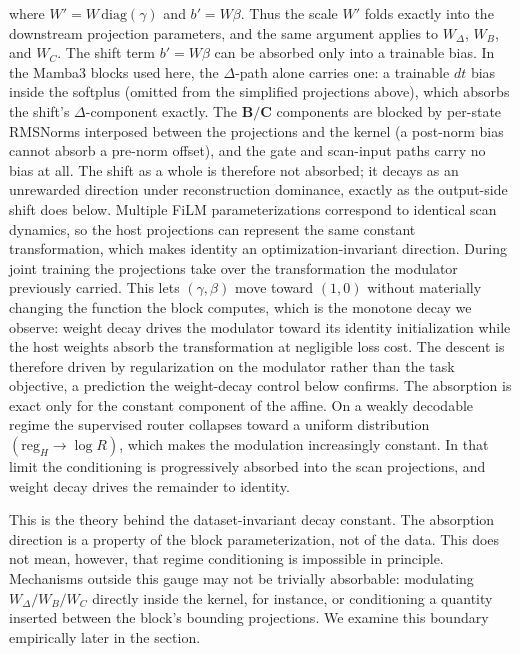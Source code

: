 \documentclass{article}
\newcommand{\regH}{\mathrm{reg}_H}
\begin{document}
where $W' = W\,\mathrm{diag}(\gamma)$ and $b' = W\beta$.
Thus the scale $W'$ folds exactly into the downstream projection parameters, and the same argument applies to \(W_\Delta\), \(W_B\), and \(W_C\). The shift term $b'=W\beta$ can be absorbed only into a trainable bias. In the Mamba3 blocks used here, the $\Delta$-path alone carries one: a trainable $dt$ bias inside the softplus (omitted from the simplified projections above), which absorbs the shift's $\Delta$-component exactly. The $\mathbf{B}/\mathbf{C}$ components are blocked by per-state RMSNorms interposed between the projections and the kernel (a post-norm bias cannot absorb a pre-norm offset), and the gate and scan-input paths carry no bias at all. The shift as a whole is therefore not absorbed; it decays as an unrewarded direction under reconstruction dominance, exactly as the output-side shift does below. Multiple FiLM parameterizations correspond to identical scan dynamics, so the host projections can represent the same constant transformation, which makes identity an optimization-invariant direction. During joint training the projections take over the transformation the modulator previously carried. This lets \((\gamma,\beta)\) move toward \((1,0)\) without materially changing the function the block computes, which is the monotone decay we observe: weight decay drives the modulator toward its identity initialization while the host weights absorb the transformation at negligible loss cost. The descent is therefore driven by regularization on the modulator rather than the task objective, a prediction the weight-decay control below confirms.
The absorption is exact only for the constant component of the affine. On a weakly decodable regime the supervised router collapses toward a uniform distribution \((\regH\to\log R)\), which makes the modulation increasingly constant. In that limit the conditioning is progressively absorbed into the scan projections, and weight decay drives the remainder to identity.

This is the theory behind the dataset-invariant decay constant. The absorption direction is a property of the block parameterization, not of the data. This does not mean, however, that regime conditioning is impossible in principle. Mechanisms outside this gauge may not be trivially absorbable: modulating $W_\Delta/W_B/W_C$ directly inside the kernel, for instance, or conditioning a quantity inserted between the block's bounding projections. We examine this boundary empirically later in the section.
\end{document}
